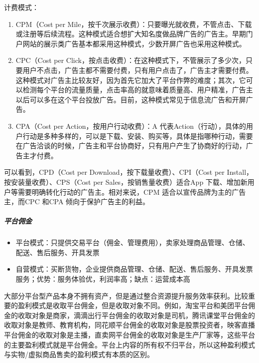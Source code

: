 \documentclass[letterpaper,11pt,english]{sphinxmanual}
\begin{document}
计费模式：
\begin{enumerate}
%
\item {} 
CPM（Cost per
Mile，按千次展示收费）：只要曝光就收费，不管点击、下载或注册等后续流程。这种模式适合想扩大知名度做品牌广告的广告主。早期门户网站的展示类广告基本都采用这种模式，少数开屏广告也采用这种模式。

\item {} 
CPC（Cost per
Click，按点击收费）：在这种模式下，不管展示了多少次，只要用户不点击，广告主都不需要付费，只有用户点击了，广告主才需要付费。这种模式对广告主比较友好，因为首先它加大了平台作弊的难度；其次，它可以检测每个平台的流量质量，点击率高的就意味着质量高、用户精准，广告主以后可以多在这个平台投放广告。目前，这种模式常见于信息流广告和开屏广告。

\item {} 
CPA（Cost per Action，按用户行动收费）：A
代表Action（行动），具体的用户行动是多种多样的，可以是下载、安装、购买等，具体是指哪种行动，需要在广告洽谈的时候，广告主和平台协商好，只有用户产生了协商好的行动，广告主才付费。

\end{enumerate}

可以看到，CPD（Cost per Download，按下载量收费）、CPI（Cost per
Install，按安装量收费）、CPS（Cost per Sales，按销售量收费）适合App
下载、增加新用户等需要明确转化行动的广告主。相对来说，CPM
适合以宣传品牌为主的广告主，而CPC 和CPA 倾向于保护广告主的利益。


\subparagraph{平台佣金}
\label{\detokenize{chapter_introduction/money:id11}}\begin{itemize}
\item {} 
平台模式：只提供交易平台（佣金、管理费用），卖家处理商品管理、仓储、配送、售后服务、开具发票

\item {} 
自营模式：买断货物，企业提供商品管理、仓储、配送、售后服务、开具发票服务；优势：服务体验优，利润率高；缺点：运营成本高

\end{itemize}

大部分平台型产品本身不拥有资产，但是通过整合资源提升服务效率获利。比较重要的盈利模式是收取平台佣金，但是收取对象不同。例如，淘宝平台和美团平台佣金的收取对象是商家，滴滴出行平台佣金的收取对象是司机，腾讯课堂平台佣金的收取对象是教师、教育机构，同花顺平台佣金的收取对象是股票投资者，映客直播平台佣金的收取对象是主播，直卖网平台佣金的收取对象是生产厂家等，这些平台的主要盈利模式就是平台佣金。平台上内容的所有权不归平台，所以这种盈利模式与实物/虚拟商品售卖的盈利模式有本质的区别。
\end{document}
